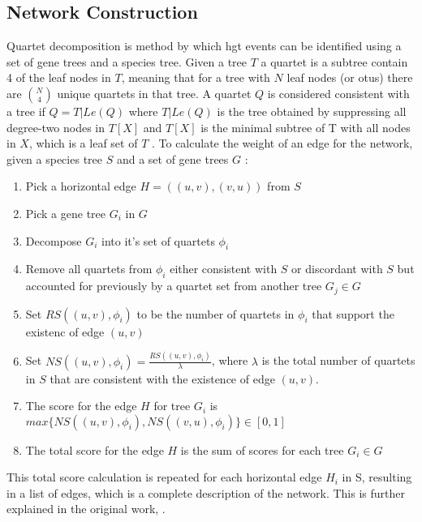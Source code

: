 \subsection{Network Construction}
Quartet decomposition is method by which \ac{hgt} events can be identified using a set of gene trees and a species tree.
Given a tree $T$ a quartet is a subtree contain 4 of the leaf nodes in $T$, meaning that for a tree with $N$ leaf nodes (or \ac{otu}s) there are $\binom{N}{4}$ unique quartets in that tree.
A quartet $Q$ is considered consistent with a tree if $Q = T|Le(Q)$ where $T|Le(Q)$ is the tree obtained by suppressing all degree-two nodes in $T[X]$ and $T[X]$ is the minimal subtree of T with all nodes in $X$, which is a leaf set of $T$ \citep{hide}.
To calculate the weight of an edge for the network, given a species tree $S$ and a set of gene trees $G$ \citep{hide}:
\begin{enumerate}
    \item Pick a horizontal edge $H = ((u,v),(v,u))$ from $S$
    \item Pick a gene tree $G_i$ in $G$
    \item Decompose $G_i$ into it's set of quartets $\phi_i$
    \item Remove all quartets from $\phi_i$ either consistent with $S$ or discordant with $S$ but accounted for previously by a quartet set from another tree $G_j \in G$
    \item Set $RS((u,v),\phi_i)$ to be the number of quartets in $\phi_i$ that support the existenc of edge $(u,v)$
    \item Set $NS((u,v),\phi_i) = \frac{RS((u,v),\phi_i)}{\lambda}$, where $\lambda$ is the total number of quartets in $S$ that are consistent with the existence of edge $(u,v)$.
    \item The score for the edge $H$ for tree $G_i$ is $max\{NS((u,v),\phi_i),NS((v,u),\phi_i)\} \in [0,1]$
    \item The total score for the edge $H$ is the sum of scores for each tree $G_i \in G$
\end{enumerate}
This total score calculation is repeated for each horizontal edge $H_i$ in S, resulting in a list of edges, which is a complete description of the network.
This is further explained in the original work, \citep{hide}.
